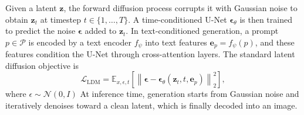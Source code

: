 Given a latent $\mathbf{z}$, the forward diffusion process corrupts it with Gaussian noise to obtain $\mathbf{z}_t$ at timestep $t \in \{1,\dots,T\}$. 
A time-conditioned U-Net $\boldsymbol{\epsilon}_\theta$ is then trained to predict the noise $\boldsymbol{\epsilon}$ 
added to $\mathbf{z}_t$. 
In text-conditioned generation, a prompt $p \in \mathcal{P}$ is encoded by a text encoder $f_{\psi}$ into text features $\mathbf{e}_p = f_{\psi}(p)$, and these features condition the U-Net through cross-attention layers. 
The standard latent diffusion objective is
\begin{equation}
\label{eq:ldm_loss}
\mathcal{L}_{\mathrm{LDM}}
=
\mathbb{E}_{x,\epsilon,t}
\left[
\left\|
\boldsymbol{\epsilon} - \boldsymbol{\epsilon}_\theta(\mathbf{z}_t, t, \mathbf{e}_p)
\right\|_2^2
\right],
\end{equation}
where $\epsilon \sim \mathcal{N}(0,I)$ 
At inference time, generation starts from Gaussian noise and iteratively denoises toward a clean latent, which is finally decoded into an image.


